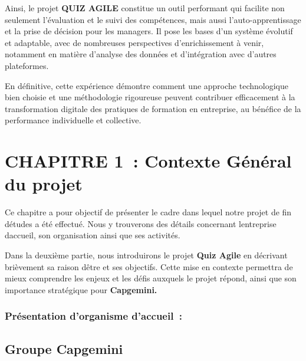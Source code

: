 \documentclass[12pt,a4paper,twoside]{report}
\begin{document}
Ainsi, le projet \textbf{QUIZ AGILE} constitue un outil performant qui
facilite non seulement l'évaluation et le suivi des compétences, mais
aussi l'auto-apprentissage et la prise de décision pour les managers. Il
pose les bases d'un système évolutif et adaptable, avec de nombreuses
perspectives d'enrichissement à venir, notamment en matière d'analyse
des données et d'intégration avec d'autres plateformes.

En définitive, cette expérience démontre comment une approche
technologique bien choisie et une méthodologie rigoureuse peuvent
contribuer efficacement à la transformation digitale des pratiques de
formation en entreprise, au bénéfice de la performance individuelle et
collective.

\hypertarget{section}{%
\section{}\label{section}}

\hypertarget{chapitre-1-contexte-guxe9nuxe9ral-du-projet}{%
\section{CHAPITRE 1~: Contexte Général du
projet}\label{chapitre-1-contexte-guxe9nuxe9ral-du-projet}}

Ce chapitre a pour objectif de présenter le cadre dans lequel notre
projet de fin d\textquotesingle études a été effectué. Nous y trouverons
des détails concernant l\textquotesingle entreprise
d\textquotesingle accueil, son organisation ainsi que ses activités.

Dans la deuxième partie, nous introduirons le projet \textbf{Quiz Agile}
en décrivant brièvement sa raison d\textquotesingle être et ses
objectifs. Cette mise en contexte permettra de mieux comprendre les
enjeux et les défis auxquels le projet répond, ainsi que son importance
stratégique pour \textbf{Capgemini.}

\hypertarget{pruxe9sentation-dorganisme-daccueil}{%
\subsubsection{Présentation d'organisme
d'accueil~:}\label{pruxe9sentation-dorganisme-daccueil}}

\hypertarget{groupe-capgemini}{%
\subsection{Groupe Capgemini ~}\label{groupe-capgemini}}
\end{document}
